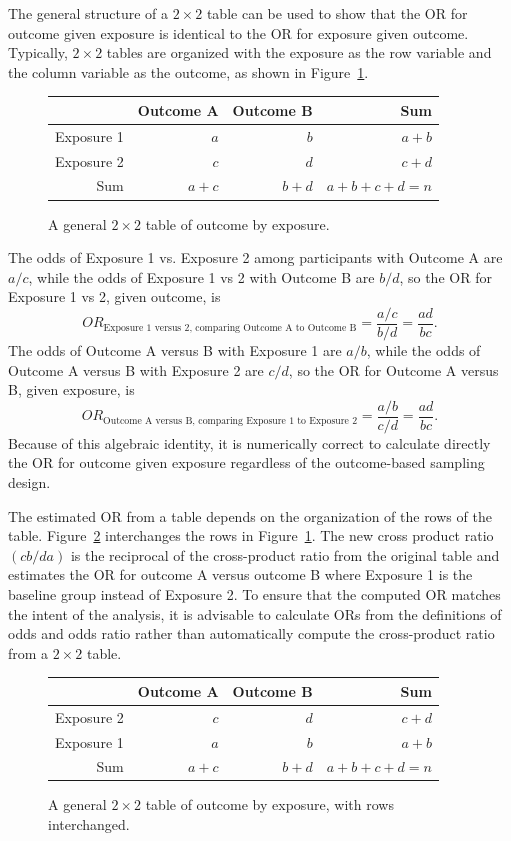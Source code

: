 The general structure of a $2 \times 2$ table can be used to show that the OR for outcome given exposure is identical to the OR for exposure given outcome.  Typically, $2 \times 2$ tables are organized with the exposure as the row variable and the column variable as the outcome, as shown in Figure~\ref{figure:generalTwoByTwoTable}.
\begin{figure}[h!]
	\centering
	\begin{tabular}{r|rrr}
		\hline
		& Outcome A & Outcome B & Sum\\
		\hline
		Exposure 1 & $a$ & $b$ & $a + b$ \\
		Exposure 2 & $c$ & $d$ & $c + d$ \\
		Sum & $a + c$ & $b + d$ & $a + b + c + d = n$ \\
		\hline
	\end{tabular}
  \caption{A general $2 \times 2$ table of outcome by exposure.}
  \label{figure:generalTwoByTwoTable}
  \end{figure}

The odds of Exposure 1 vs. Exposure 2 among participants with Outcome A are $a/c$, while the odds of Exposure 1 vs 2 with Outcome B are $b/d$, so the OR for Exposure 1 vs 2, given outcome, is
\[OR_{\text{Exposure 1 versus 2, comparing Outcome A to Outcome B}} = \dfrac{a/c}{b/d} = \dfrac{ad}{bc}. \]
The odds of Outcome A versus B with Exposure 1 are $a/b$, while the odds of Outcome A versus B with Exposure 2 are $c/d$, so the OR for Outcome A versus B, given exposure, is
\[OR_{\text{Outcome A versus B, comparing Exposure 1 to Exposure 2}} = \dfrac{a/b}{c/d} = \dfrac{ad}{bc}.
\]
Because of this algebraic identity, it is numerically correct to calculate directly the OR for outcome given exposure regardless of the outcome-based sampling design.

The estimated OR from a table depends on the organization of the rows of the table.
Figure~\ref{figure:generalTwoByTwoTableReversed} interchanges the rows in Figure~\ref{figure:generalTwoByTwoTable}.  The new cross product ratio $(cb/da)$ is the reciprocal of the cross-product ratio from the original table and estimates the OR for outcome A versus outcome B where Exposure 1 is the baseline group instead of Exposure 2. To ensure that the computed OR matches the intent of the analysis, it is advisable to calculate ORs from the definitions of odds and odds ratio rather than automatically compute the cross-product ratio from a $2 \times 2$ table.


\begin{figure}[h!]
	\centering
	\begin{tabular}{r|rrr}
		\hline
		& Outcome A & Outcome B & Sum\\
		\hline
		Exposure 2 & $c$ & $d$ & $c + d$ \\
		Exposure 1 & $a$ & $b$ & $a + b$ \\
		Sum & $a + c$ & $b + d$ & $a + b + c + d = n$ \\
		\hline
	\end{tabular}
  \caption{A general $2 \times 2$ table of outcome by exposure, with rows interchanged.}
  \label{figure:generalTwoByTwoTableReversed}
  \end{figure}

